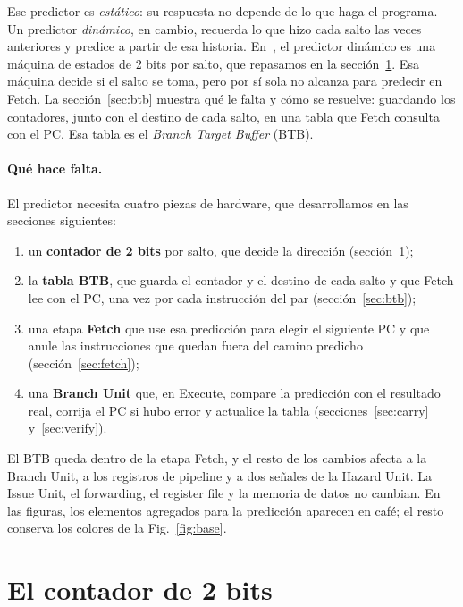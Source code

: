 \documentclass[11pt,a4paper]{article}
\begin{document}
Ese predictor es \emph{estático}: su respuesta no depende de lo que haga el programa. Un
predictor \emph{dinámico}, en cambio, recuerda lo que hizo cada salto las veces anteriores
y predice a partir de esa historia. En~\cite{harris}, el predictor dinámico es una máquina
de estados de 2 bits por salto, que repasamos en la sección~\ref{sec:counter}. Esa máquina
decide si el salto se toma, pero por sí sola no alcanza para predecir en Fetch. La
sección~\ref{sec:btb} muestra qué le falta y cómo se resuelve: guardando los contadores,
junto con el destino de cada salto, en una tabla que Fetch consulta con el PC. Esa tabla es
el \emph{Branch Target Buffer} (BTB).

\paragraph{Qué hace falta.} El predictor necesita cuatro piezas de hardware, que
desarrollamos en las secciones siguientes:
\begin{enumerate}
  \item un \textbf{contador de 2 bits} por salto, que decide la dirección
        (sección~\ref{sec:counter});
  \item la \textbf{tabla BTB}, que guarda el contador y el destino de cada salto y que
        Fetch lee con el PC, una vez por cada instrucción del par (sección~\ref{sec:btb});
  \item una etapa \textbf{Fetch} que use esa predicción para elegir el siguiente PC y que
        anule las instrucciones que quedan fuera del camino predicho
        (sección~\ref{sec:fetch});
  \item una \textbf{Branch Unit} que, en Execute, compare la predicción con el resultado
        real, corrija el PC si hubo error y actualice la tabla
        (secciones~\ref{sec:carry} y~\ref{sec:verify}).
\end{enumerate}
El BTB queda dentro de la etapa Fetch, y el resto de los cambios afecta a la Branch Unit, a
los registros de pipeline y a dos señales de la Hazard Unit. La Issue Unit, el forwarding,
el register file y la memoria de datos no cambian. En las figuras, los elementos agregados
para la predicción aparecen en café; el resto conserva los colores de la
Fig.~\ref{fig:base}.

\section{El contador de 2 bits}
\label{sec:counter}
\end{document}
